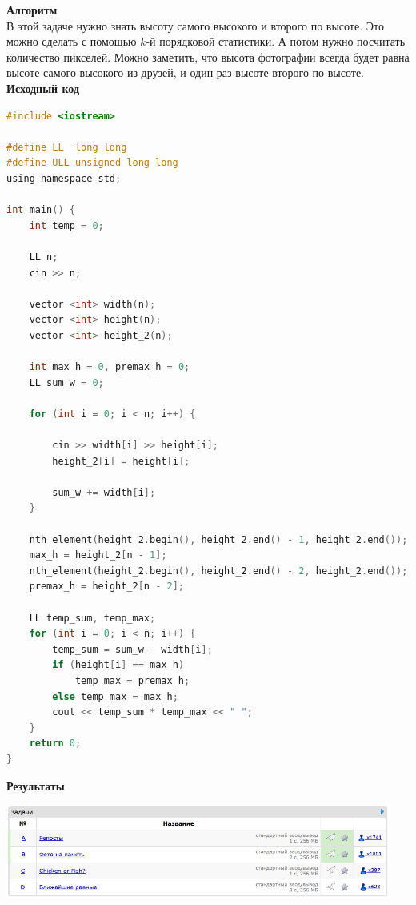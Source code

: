 \documentclass[a4paper,12pt]{article}
\begin{document}
\textbf{{\large Алгоритм}} \\
В этой задаче нужно знать высоту самого высокого и второго по высоте. Это можно сделать с помощью $k$-й порядковой статистики. А потом нужно посчитать количество пикселей. Можно заметить, что высота фотографии всегда будет равна высоте самого высокого из друзей, и один раз высоте второго по высоте.\\

\textbf{{\large Исходный код}}
\begin{lstlisting}[language=C]
#include <iostream>

#define LL  long long
#define ULL unsigned long long
using namespace std;

int main() {
	int temp = 0;

	LL n;
	cin >> n;

	vector <int> width(n);
	vector <int> height(n);
	vector <int> height_2(n);

	int max_h = 0, premax_h = 0;
	LL sum_w = 0;

	for (int i = 0; i < n; i++) {

		cin >> width[i] >> height[i];
		height_2[i] = height[i];

		sum_w += width[i];
	}

	nth_element(height_2.begin(), height_2.end() - 1, height_2.end());
	max_h = height_2[n - 1];
	nth_element(height_2.begin(), height_2.end() - 2, height_2.end());
	premax_h = height_2[n - 2];
	
	LL temp_sum, temp_max;
	for (int i = 0; i < n; i++) {
		temp_sum = sum_w - width[i];
		if (height[i] == max_h)
			temp_max = premax_h;
		else temp_max = max_h;
		cout << temp_sum * temp_max << " ";
	}
	return 0;
}
\end{lstlisting}

\textbf{{\large Результаты}} \\
\begin{center}
\includegraphics[width=0.95\textwidth]{VK_Qual/VK_Qual_result.png}\\ [1cm]
\end{center}




%
%
\end{document}
